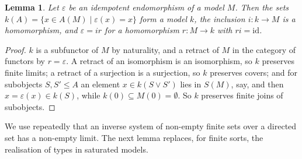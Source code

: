 \documentclass[11pt]{amsart}
\newtheorem{lem}[thm]{Lemma}
\theoremstyle{definition}
\newcommand{\id}{\mathrm{id}}
\begin{document}
\begin{lem}\label{lem:retract}
Let $\varepsilon$ be an idempotent endomorphism of a model $M$. Then
the sets $k(A)=\{x\in A(M)\mid\varepsilon(x)=x\}$ form a model $k$,
the inclusion $i\colon k\to M$ is a homomorphism, and
$\varepsilon=ir$ for a homomorphism $r\colon M\to k$ with $ri=\id$.
\end{lem}
\begin{proof}
$k$ is a subfunctor of $M$ by naturality, and a retract of $M$ in the
category of functors by $r=\varepsilon$. A retract of an isomorphism
is an isomorphism, so $k$ preserves finite limits; a retract of a
surjection is a surjection, so $k$ preserves covers; and for
subobjects $S,S'\le A$ an element $x\in k(S\vee S')$ lies in $S(M)$,
say, and then $x=\varepsilon(x)\in k(S)$, while $k(0)\subseteq
M(0)=\emptyset$. So $k$ preserves finite joins of subobjects.
\end{proof}

We use repeatedly that an inverse system of non-empty finite sets over
a directed set has a non-empty limit. The next lemma replaces, for
finite sorts, the realisation of types
in saturated models.
\end{document}
